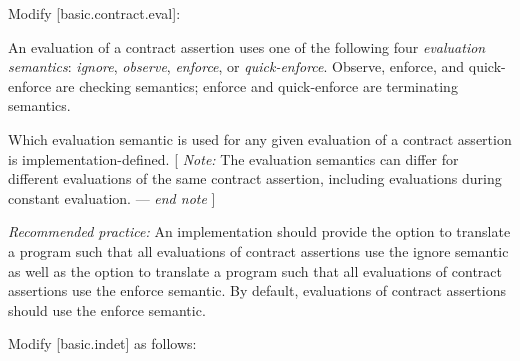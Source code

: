 Modify [basic.contract.eval]:

\begin{adjustwidth}{0.5cm}{0.5cm}
An evaluation of a contract assertion uses one of the following four \emph{evaluation semantics}: \emph{ignore}, \emph{observe}, \emph{enforce}, or \emph{quick-enforce}. Observe, enforce, and quick-enforce are checking semantics; enforce and quick-enforce are terminating semantics.

Which evaluation semantic is used for any given evaluation of a contract assertion is implementation-defined.  [ \emph{Note:} The evaluation semantics can differ for different evaluations of the same contract assertion, including evaluations during constant evaluation. --- \emph{end note} ]

\emph{Recommended practice:} An implementation should provide the option to translate a program such that all evaluations of contract assertions use the ignore semantic as well as the option to translate a program such that all evaluations of contract assertions use the enforce semantic. By default, evaluations of contract assertions should use the enforce semantic.
\end{adjustwidth}

Modify [basic.indet] as follows:


